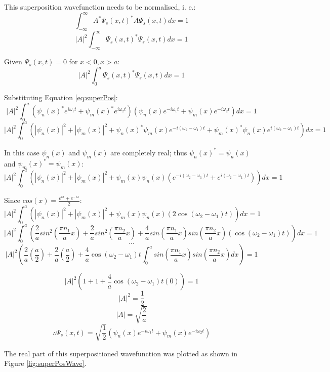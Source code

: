 This superposition wavefunction needs to be normalised, i. e.:
$$\int_{ -\infty}^{\infty} A^{*} \Psi_s (x,t)^{*} A\Psi_s (x,t)dx = 1$$
$$\left | A \right |^2 \int_{ -\infty}^{\infty} \Psi_s (x,t)^{*} \Psi_s (x,t)dx = 1$$

Given $\Psi_s (x,t)=0$ for $x<0, x>a$:
$$\left | A \right |^2 \int_{0}^{a} \Psi_s (x,t)^{*} \Psi_s (x,t)dx = 1$$

Substituting Equation \ref{eq:superPos}:
$$\left | A \right |^2 \int_{0}^{a} (\psi_n (x)^{*}e^{i \omega_{1} t} + \psi_m (x)^{*}e^{i \omega_{2} t}) (\psi_n (x)e^{-i \omega_{1} t} + \psi_m (x)e^{-i \omega_{2} t})dx = 1$$
$$\left | A \right |^2 \int_{0}^{a} (\left | \psi_n (x) \right |^2 + \left | \psi_m (x) \right |^2 + \psi_n (x)^{*}\psi_m (x)e^{-i(\omega_{2}- \omega_{1}) t} + \psi_m (x)^{*}\psi_n (x)e^{i(\omega_{2}- \omega_{1}) t})dx = 1$$

In this case $\psi_n (x)$ and $\psi_m (x)$ are completely real; thus $\psi_n (x)^{*} = \psi_n (x)$ and $\psi_m (x)^{*} = \psi_m (x)$:
$$ \left | A \right |^2 \int_{0}^{a}\left( \left | \psi_n (x) \right |^2 + \left | \psi_m (x) \right |^2 + \psi_m (x)\psi_n (x)(e^{-i(\omega_{2}- \omega_{1})t}+e^{i(\omega_{2}- \omega_{1})t})\right)dx = 1$$

Since $cos(x) = \frac{e^{ix}+e^{-ix}}{2}$:
$$ \left | A \right |^2 \int_{0}^{a}\left( \left | \psi_n (x) \right |^2 + \left | \psi_m (x) \right |^2 + \psi_m (x)\psi_n (x)(2\cos(\omega_{2}- \omega_{1})t)\right)dx = 1$$
$$ \left | A \right |^2 \int_{0}^{a}\left(\frac{2}{a} sin^{2}(\frac{\pi n_1}{a}x)+\frac{2}{a} sin^{2}(\frac{\pi n_2}{a}x)+\frac{4}{a} sin(\frac{\pi n_1}{a}x)sin(\frac{\pi n_2}{a}x)(\cos(\omega_{2}- \omega_{1})t)\right)dx = 1$$
$$...$$
$$\left | A \right |^2 \left( \frac{2}{a}\left(\frac{a}{2}\right) + \frac{2}{a}\left(\frac{a}{2}\right) + \frac{4}{a}\cos(\omega_{2}- \omega_{1})t\int_{0}^{a} sin(\frac{\pi n_1}{a}x)sin(\frac{\pi n_2}{a}x)dx \right)=1$$

$$\left | A \right |^2 \left( 1 + 1 + \frac{4}{a}\cos(\omega_{2}- \omega_{1})t(0) \right)=1$$
$$\left | A \right |^2 = \frac{1}{2}$$
$$\left | A \right | = \sqrt{\frac{2}{a}}$$
$$\therefore \Psi_s (x, t) = \sqrt{\frac{1}{2}} \left( \psi_n (x)e^{-i \omega_{1} t} + \psi_m (x)e^{-i \omega_{2} t}\right)$$

The real part of this superpositioned wavefunction was plotted as shown in Figure \ref{fig:superPosWave}.

